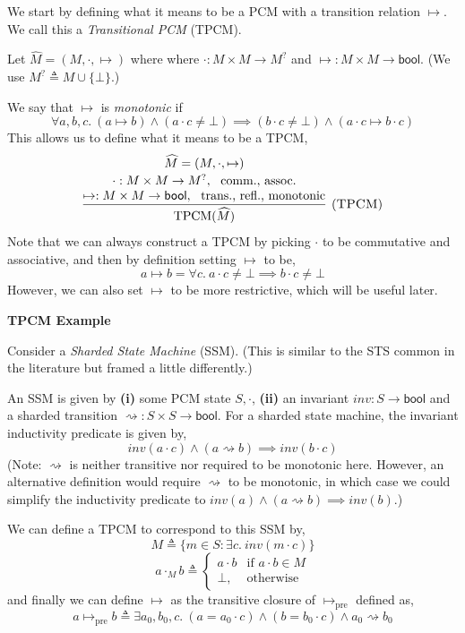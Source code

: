 \documentclass{article}
\newcommand{\einfer}[3]
        {\infer[(\textsc{#1})]{#3}{#2}}
\newcommand{\stacktwo}[2]{\stackanchor{\ensuremath{#1}}{\ensuremath{#2}}}
\newcommand{\stackthree}[3]{\stackanchor{\stacktwo{#1}{#2}}{\ensuremath{#3}}}
\newcommand{\bool}{\textsf{bool}}
\DeclareMathOperator{\TPCM}{TPCM}
\renewcommand{\eqdef}{\triangleq}
\begin{document}
We start by defining what it means to be a PCM with a transition relation $\mapsto$.
We call this a \emph{Transitional PCM} (TPCM).

Let $\widehat{M} = (M, \cdot, \mapsto)$ where
where $\cdot : M \times M \to M^?$
and $\mapsto : M \times M \to \bool$.
(We use $M^? \eqdef M \cup \{\bot\}$.)

We say that $\mapsto$ is \emph{monotonic} if
\[ \forall a, b, c.~ (a \mapsto b) \land (a \cdot c \ne \bot) \implies (b \cdot c \ne \bot) \land (a \cdot c \mapsto b \cdot c) \]
This allows us to define what it means to be a TPCM,
\[
  \einfer{TPCM}{
    \stackthree{
      \widehat{M} = (M, \cdot, \mapsto)
    }{
      \cdot : M \times M \to M^?, \text{~~comm., assoc.}
    }{
      \mapsto : M \times M \to \bool, \text{~~trans., refl., monotonic}
    }
  }{
    \TPCM(\widehat{M})
  }
\]
Note that we can always construct a TPCM by picking $\cdot$ to be commutative and associative,
and then by definition setting $\mapsto$ to be,
\[
  a \mapsto b = \forall c .~ a \cdot c \ne \bot \implies b \cdot c \ne \bot
\]
However, we can also set $\mapsto$ to be more restrictive, which will be useful later.

\textbf{TPCM Example}

Consider a \emph{Sharded State Machine} (SSM). (This is similar to the STS common in the literature but framed a little differently.)

An SSM is given by \textbf{(i)} some PCM state $S, \cdot$, \textbf{(ii)} an invariant $inv : S \to \bool$ and a sharded transition $\rightsquigarrow : S \times S \to \bool$. For a sharded state
machine, the invariant inductivity predicate is given by,
\[
  inv(a \cdot c) \land (a \rightsquigarrow b) \implies inv(b \cdot c)
\]
(Note: $\rightsquigarrow$ is neither transitive nor required to be monotonic here. However, an alternative definition would require $\rightsquigarrow$ to be monotonic, in which case we could
simplify the inductivity predicate to $inv(a) \land (a \rightsquigarrow b) \implies inv(b)$.)

We can define a TPCM to correspond to this SSM by,
\[M \eqdef \{m \in S : \exists c .~ inv(m \cdot c) \}\]
\[a \cdot_M b \eqdef 
  \begin{cases}
      a \cdot b & \text{if } a \cdot b \in M\\
      \bot,              & \text{otherwise}
  \end{cases}\]
and finally we can define $\mapsto$ as the transitive closure of $\mapsto_\text{pre}$ defined as,
\[
a \mapsto_{\text{pre}} b \eqdef
  \exists a_0, b_0, c .~ (a = a_0 \cdot c) \land (b = b_0 \cdot c) \land a_0 \rightsquigarrow b_0
\]
\end{document}
